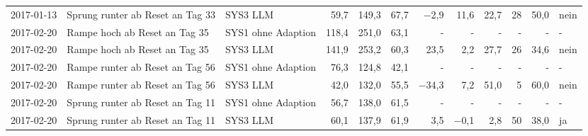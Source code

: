 \begin{tabular}{lllrrrrrrrrl}
2017-01-13 & Sprung runter ab Reset an Tag 33 & SYS3 LLM & 59,7 & 149,3 & 67,7 & $-$2,9 & 11,6 & 22,7 & 28 & 50,0 & nein \\
2017-02-20 & Rampe hoch ab Reset an Tag 35 & SYS1 ohne Adaption & 118,4 & 251,0 & 63,1 & - & - & - & - & - & - \\
2017-02-20 & Rampe hoch ab Reset an Tag 35 & SYS3 LLM & 141,9 & 253,2 & 60,3 & 23,5 & 2,2 & 27,7 & 26 & 34,6 & nein \\
2017-02-20 & Rampe runter ab Reset an Tag 56 & SYS1 ohne Adaption & 76,3 & 124,8 & 42,1 & - & - & - & - & - & - \\
2017-02-20 & Rampe runter ab Reset an Tag 56 & SYS3 LLM & 42,0 & 132,0 & 55,5 & $-$34,3 & 7,2 & 51,0 & 5 & 60,0 & nein \\
2017-02-20 & Sprung runter ab Reset an Tag 11 & SYS1 ohne Adaption & 56,7 & 138,0 & 61,5 & - & - & - & - & - & - \\
2017-02-20 & Sprung runter ab Reset an Tag 11 & SYS3 LLM & 60,1 & 137,9 & 61,9 & 3,5 & $-$0,1 & 2,8 & 50 & 38,0 & ja \\
\bottomrule
\end{tabular}
